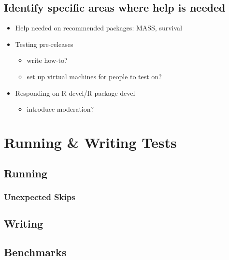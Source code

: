 \documentclass[]{book}
\providecommand{\tightlist}{%
  \setlength{\itemsep}{0pt}\setlength{\parskip}{0pt}}
\begin{document}
\hypertarget{identify-specific-areas-where-help-is-needed}{%
\section{Identify specific areas where help is needed}\label{identify-specific-areas-where-help-is-needed}}

\begin{itemize}
\tightlist
\item
  Help needed on recommended packages: MASS, survival
\item
  Testing pre-releases

  \begin{itemize}
  \tightlist
  \item
    write how-to?
  \item
    set up virtual machines for people to test on?
  \end{itemize}
\item
  Responding on R-devel/R-package-devel

  \begin{itemize}
  \tightlist
  \item
    introduce moderation?
  \end{itemize}
\end{itemize}

\hypertarget{running-writing-tests}{%
\chapter{Running \& Writing Tests}\label{running-writing-tests}}

\hypertarget{running}{%
\section{Running}\label{running}}

\hypertarget{unexpected-skips}{%
\subsection{Unexpected Skips}\label{unexpected-skips}}

\hypertarget{writing}{%
\section{Writing}\label{writing}}

\hypertarget{benchmarks}{%
\section{Benchmarks}\label{benchmarks}}
\end{document}
